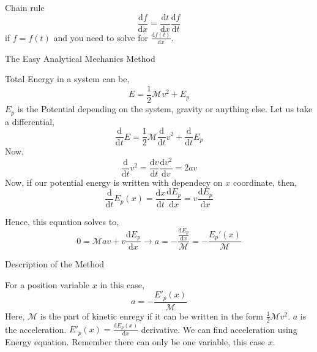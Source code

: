 \documentclass[9pt,serif]{beamer}
\newcommand{\id}[1]{ \begin{idea} #1 \end{idea} }
\begin{document}
\begin{frame}
    {Chain rule}
    \[ \frac{\mathrm{d} f}{\mathrm{d} x} = \frac{\mathrm{d} t}{\mathrm{d} x} \frac{\mathrm{d} f}{\mathrm{d} t} \]
    if $f = f(t)$ and you need to solve for $\frac{\mathrm{d} f(t)}{\mathrm{d} x}$.
\end{frame}








\begin{frame}
    {The Easy Analytical Mechanics Method}
    \id{\begin{small} 
        Total Energy in a system can be, 
        \[ E = \frac{1}{2} \mathcal{M} v^2 + E_p \]
        $E_p$ is the Potential depending on the system, gravity or anything else.
        Let us take a differential, 
        \[ \frac{\mathrm{d} }{\mathrm{d}  
        t} E = \frac{1}{2} \mathcal{M } \frac{\mathrm{d}  }{\mathrm{d}  t} v^2 +
    \frac{\mathrm{d} }{\mathrm{d}  t} E_p       \]
    Now, \[ \frac{\mathrm{d} }{\mathrm{d} t} v^2 = \frac{\mathrm{d} v}{\mathrm{d} t} \frac{\mathrm{d} v^2}{\mathrm{d} v} = 2 a v \]
    Now, if our potential energy is written with dependecy on $x$ coordinate, then, 
    \[ \frac{\mathrm{d} }{\mathrm{d} t} E_p(x) = \frac{\mathrm{d} x}{\mathrm{d} t} \frac{\mathrm{d} E_p}{\mathrm{d} x} = v \frac{\mathrm{d} E_p}{\mathrm{d} x}  \]
    
    Hence, this equation solves to,
    \[ 0 = \mathcal{M} av + v \frac{\mathrm{d} E_p}{\mathrm{d} x}      
    \to
\boxed{ 
    a = - \frac{\frac{\mathrm{d} E_p}{\mathrm{d} x}}{\mathcal{M}} 
    = - \frac{E_p'(x)}{\mathcal{ M}}
}\]
\end{small} 
}       
 

\end{frame}



\begin{frame}
    {Description of the Method}

    \id{ For a position variable $x$ in  this case, 
        \[ a = - \frac{E'_p(x)}{\mathcal{M}} \]
    Here, $\mathcal{M} $ is the part of kinetic enregy if it can be written in the form $\frac{1}{2 } \mathcal{M} v^2$. $a$ is the acceleration. $E'_p(x)= \frac{\mathrm{d} E_p(x)}{\mathrm{d} x}$ derivative. We can find acceleration using Energy equation. Remember there can only be one variable, this case $x$. }
\end{frame}
\end{document}
